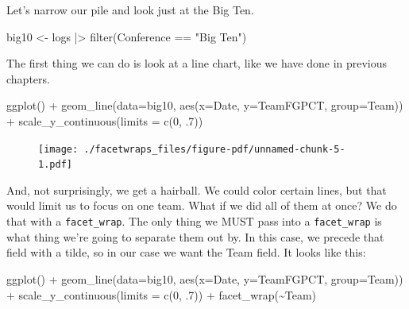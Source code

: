 \documentclass[
  letterpaper,
  DIV=11,
  numbers=noendperiod]{scrreprt}
\newenvironment{Shaded}{\begin{snugshade}}{\end{snugshade}}
\newcommand{\AttributeTok}[1]{\textcolor[rgb]{0.40,0.45,0.13}{#1}}
\newcommand{\DecValTok}[1]{\textcolor[rgb]{0.68,0.00,0.00}{#1}}
\newcommand{\FunctionTok}[1]{\textcolor[rgb]{0.28,0.35,0.67}{#1}}
\newcommand{\NormalTok}[1]{\textcolor[rgb]{0.00,0.23,0.31}{#1}}
\newcommand{\OtherTok}[1]{\textcolor[rgb]{0.00,0.23,0.31}{#1}}
\newcommand{\SpecialCharTok}[1]{\textcolor[rgb]{0.37,0.37,0.37}{#1}}
\newcommand{\StringTok}[1]{\textcolor[rgb]{0.13,0.47,0.30}{#1}}
\begin{document}
Let's narrow our pile and look just at the Big Ten.

\begin{Shaded}
\begin{Highlighting}[]
\NormalTok{big10 }\OtherTok{\textless{}{-}}\NormalTok{ logs }\SpecialCharTok{|\textgreater{}} \FunctionTok{filter}\NormalTok{(Conference }\SpecialCharTok{==} \StringTok{"Big Ten"}\NormalTok{)}
\end{Highlighting}
\end{Shaded}

The first thing we can do is look at a line chart, like we have done in
previous chapters.

\begin{Shaded}
\begin{Highlighting}[]
\FunctionTok{ggplot}\NormalTok{() }\SpecialCharTok{+} 
  \FunctionTok{geom\_line}\NormalTok{(}\AttributeTok{data=}\NormalTok{big10, }\FunctionTok{aes}\NormalTok{(}\AttributeTok{x=}\NormalTok{Date, }\AttributeTok{y=}\NormalTok{TeamFGPCT, }\AttributeTok{group=}\NormalTok{Team)) }\SpecialCharTok{+} 
  \FunctionTok{scale\_y\_continuous}\NormalTok{(}\AttributeTok{limits =} \FunctionTok{c}\NormalTok{(}\DecValTok{0}\NormalTok{, .}\DecValTok{7}\NormalTok{))}
\end{Highlighting}
\end{Shaded}

\begin{figure}[H]

{\centering \texttt{[image: ./facetwraps\_files/figure-pdf/unnamed-chunk-5-1.pdf]}

}

\end{figure}

And, not surprisingly, we get a hairball. We could color certain lines,
but that would limit us to focus on one team. What if we did all of them
at once? We do that with a \texttt{facet\_wrap}. The only thing we MUST
pass into a \texttt{facet\_wrap} is what thing we're going to separate
them out by. In this case, we precede that field with a tilde, so in our
case we want the Team field. It looks like this:

\begin{Shaded}
\begin{Highlighting}[]
\FunctionTok{ggplot}\NormalTok{() }\SpecialCharTok{+} 
  \FunctionTok{geom\_line}\NormalTok{(}\AttributeTok{data=}\NormalTok{big10, }\FunctionTok{aes}\NormalTok{(}\AttributeTok{x=}\NormalTok{Date, }\AttributeTok{y=}\NormalTok{TeamFGPCT, }\AttributeTok{group=}\NormalTok{Team)) }\SpecialCharTok{+} 
  \FunctionTok{scale\_y\_continuous}\NormalTok{(}\AttributeTok{limits =} \FunctionTok{c}\NormalTok{(}\DecValTok{0}\NormalTok{, .}\DecValTok{7}\NormalTok{)) }\SpecialCharTok{+} 
  \FunctionTok{facet\_wrap}\NormalTok{(}\SpecialCharTok{\textasciitilde{}}\NormalTok{Team)}
\end{Highlighting}
\end{Shaded}
\end{document}
